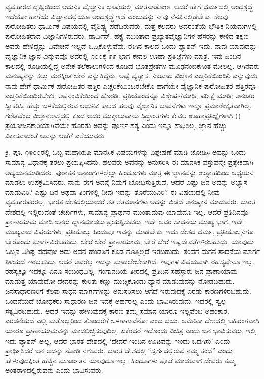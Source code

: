 ವ್ಯವಹಾರದ ದೃಷ್ಟಿಯಿಂದ ಆಧುನಿಕ ವೈಜ್ಞಾನಿಕ ಭಾಷೆಯಲ್ಲಿ ಮಾತನಾಡೋಣ. ಆದರೆ ಹೇಗೆ ಧರ್ಮದಲ್ಲಿ ಅಂಧಶ್ರದ್ಧೆ ಇದೆಯೋ ಹಾಗೆಯೆ ವಿಜ್ಞಾನದಲ್ಲಿಯೂ ಅಂಧಶ್ರದ್ಧೆ ಇದೆ ಎಂಬುದನ್ನು ನೀವು ನೆನಪಿನಲ್ಲಿಡಬೇಕು. ಕೆಲವು ಪುರೋಹಿತರು ಧಾರ್ಮಿಕ ವಿಷಯದಲ್ಲಿ ವೈಶಿಷ್ಟ್ಯ ಪಡೆದಿರುವರು. ಮತ್ತೆ ಕೆಲವರು ಅದರಂತೆಯೆ ಭೌತಿಕ ನಿಯಮಗಳಲ್ಲಿ ಪುರೋಹಿತರಾದ ವಿಜ್ಞಾನಿಗಳಿರುವರು. ಡಾರ್ವಿನ್, ಹಕ್ಸ್ಲೆ ಮುಂತಾದ ಪ್ರಖ್ಯಾತ\break ವೈಜ್ಞಾನಿಗಳ ಹೆಸರನ್ನು ಕೇಳಿದ ತಕ್ಷಣ ಅವರು ಹೇಳಿದ್ದನ್ನು ವಿವೇಚನೆ ಇಲ್ಲದೆ ಒಪ್ಪಿಕೊಳ್ಳುವೆವು. ಈಗಿನ ಕಾಲದ ಒಂದು ಫ್ಯಾಶನ್ ಇದು. ನಾವು ಯಾವುದನ್ನು ವೈಜ್ಞಾನಿಕ ಜ್ಞಾನ ಎನ್ನುವವೊ ಅದರಲ್ಲಿ ೧೦೦ಕ್ಕೆ ೯೯ ಭಾಗ ಕೇವಲ ಊಹಾ ಪ್ರತಿಜ್ಞೆಗಳು ಮಾತ್ರ. ಇವು ಹಿಂದಿನ ಕಾಲದಲ್ಲಿ ರೂಢಿಯಲ್ಲಿದ್ದ ಅನೇಕ ತಲೆಕಾಲುಗಳಿಂದ ಕೂಡಿದ ಭೂತಪ್ರೇತಗಳ ಮೂಢನಂಬಿಕೆಗಿಂತ ಮೇಲಲ್ಲ. ಆಗಿನವರು ಮನುಷ್ಯನನ್ನು ಕಲ್ಲು ಮರಕ್ಕಿಂತ ಬೇರೆ ಎನ್ನುತ್ತಿದ್ದರು. ಅಷ್ಟೆ ವ್ಯತ್ಯಾಸ. ನಿಜವಾದ ವಿಜ್ಞಾನ ಎಚ್ಚರಿಕೆಯಿಂದಿರಿ ಎನ್ನುವುದು. ನಾವು ಹೇಗೆ ಧಾರ್ಮಿಕ ಪುರೋಹಿತರ ಹತ್ತಿರ ಎಚ್ಚರಿಕೆಯಿಂದಿರಬೇಕೊ ಹಾಗೆಯೇ ವೈಜ್ಞಾನಿಕ ಪುರೋಹಿತರ ಹತ್ತಿರವೂ ಎಚ್ಚರಿಕೆಯಿಂದಿರಬೇಕು. ಅಪನಂಬಿಕೆಯಿಂದ ಹೊರಡಿ. ಪ್ರತಿಯೊಂದನ್ನೂ ವಿಶ್ಲೇಷಣೆಮಾಡಿ, ಪರೀಕ್ಷೆ ಮಾಡಿ; ಅನಂತರ ಸ್ವೀಕರಿಸಿ, ಹೆಚ್ಚು ಬಳಕೆಯಲ್ಲಿರುವ ಆಧುನಿಕ ಕಾಲದ ಹಲವು ವೈಜ್ಞಾನಿಕ ಭಾವನೆಗಳು ಇನ್ನೂ ಪ್ರಮಾಣೀಕೃತವಾಗಿಲ್ಲ. ಗಣಿತವೆಂಬ ವಿಜ್ಞಾನಶಾಸ್ತ್ರದಲ್ಲಿ ಕೂಡ ಅದರ ಮುಕ್ಕಾಲುಪಾಲು ಸಿದ್ದಾಂತಗಳು ಕೇವಲ ಊಹಾಪ್ರತಿಜ್ಞೆಗಳಾಗಿ () ಪ್ರಯೋಜನಕಾರಿಯಾಗಿವೆಯೇ ಹೊರತು ಅವನ್ನು ಪೂರ್ಣ ಸತ್ಯ ಎಂದು ಇನ್ನೂ ಸಾಧಿಸಿಲ್ಲ. ಜ್ಞಾನ ಹೆಚ್ಚು ವಿಕಾಸವಾದಂತೆ ಅವನ್ನು ಆಚೆಗೆ ಎಸೆಯುವರು.

ಕ್ರಿ. ಪೂ. ೧೪೦೦ರಲ್ಲಿ ಒಬ್ಬ ಮಹಾಋಷಿ ಮಾನಸಿಕ ವಿಷಯಗಳನ್ನು ವಿಶ್ಲೇಷಣೆ ಮಾಡಿ ಜೋಡಿಸಿ ಅವನ್ನು ಒಂದು ಸಾಮಾನ್ಯ ವಿಧಾನಕ್ಕೆ ತರಲು ಪ್ರಯತ್ನಿಸಿದನು. ಹಲವರು ಅವನನ್ನು ಅನುಸರಿಸಿ ಈ ಮಾನಸಿಕ ವಸ್ತುವನ್ನೇ ಪ್ರತ್ಯೇಕವಾಗಿ ಅಧ್ಯಯನಮಾಡಿದರು. ಪುರಾತನ ಜನಾಂಗಗಳಲ್ಲೆಲ್ಲಾ ಹಿಂದೂಗಳು ಮಾತ್ರ ಈ ಜ್ಞಾನವನ್ನು ಉತ್ಸಾಹದಿಂದ ಅಧ್ಯಯನ ಮಾಡಲು ಉಪಕ್ರಮಿಸಿದರು. ನಾನು ಈಗ ಅದನ್ನೆ ನಿಮಗೆ ಬೋಧಿಸುತ್ತಿರುವೆ. ಆದರೆ ಎಷ್ಟು ಜನ ಅದನ್ನು ಅಭ್ಯಾಸ ಮಾಡುವಿರಿ? ಎಷ್ಟು ದಿನ ಅಥವಾ ತಿಂಗಳಲ್ಲಿ ನೀವು ಇದನ್ನು ತೊರೆಯುವಿರಿ? ಈ ವಿಷಯದಲ್ಲಿ ನೀವು ವ್ಯವಹಾರಪರರಲ್ಲ. ಭಾರತ ದೇಶದಲ್ಲಿಯಾದರೆ ಶತ ಶತಮಾನಗಳು ಅದನ್ನು ಬಿಡದೆ ಅನುಷ್ಠಾನ ಮಾಡುವರು. ಭಾರತ ದೇಶದಲ್ಲಿ ಇಲ್ಲಿರುವಂತೆ ಚರ್ಚುಗಳು, ಸಾಮಾನ್ಯ ಪ್ರಾರ್ಥನೆ ಮುಂತಾದುವು ಯಾವುದೂ ಇಲ್ಲ. ಆದರೆ ಪ್ರತಿದಿನವೂ ಪ್ರಾಣಾಯಾಮ ಮಾಡಿ ಜನರು ಧ್ಯಾನಮಾಡಲು ಪ್ರಯತ್ನಿಸುವರು. ಇದೇ ಅವರ ಸಾಧನೆಯ ಮುಖ್ಯ ಭಾಗ. ಇವೇ ಮುಖ್ಯವಾದ ವಿಷಯಗಳು. ಪ್ರತಿಯೊಬ್ಬ ಹಿಂದುವೂ ಇವನ್ನು ಮಾಡಬೇಕು. ಇದು ದೇಶದ ಧರ್ಮ, ಪ್ರತಿಯೊಬ್ಬನಿಗೂ ಬೇರೊಂದು ಮಾರ್ಗವಿರಬಹುದು. ಬೇರೆ ಬೇರೆ ಪ್ರಾಣಾಯಾಮ, ಬೇರೆ ಬೇರೆ ಇಷ್ಟದೇವತೆಗಳಿರಬಹುದು. ಯಾವುದು ಒಬ್ಬನ ವಿಶಿಷ್ಟ ಪಥವೋ ಅದು ಅವನ ಹೆಂಡತಿಗೆ ಕೂಡ ಗೊತ್ತಿಲ್ಲದೆ ಇರಬಹುದು. ತಂದೆಗೆ ಮಗನ ಸಾಧನೆಯ ಮಾರ್ಗ ತಿಳಿಯದೆ ಇರಬಹುದು. ಆದರೆ ಅವರೆಲ್ಲ ಇದನ್ನು ಮಾಡಲೇಬೇಕಾಗಿದೆ. ಇವುಗಳ ವಿಷಯವಾಗಿ ರಹಸ್ಯವೇನೂ ಇಲ್ಲ. ರಹಸ್ಯಕ್ಕೂ ಇದಕ್ಕೂ ಏನೂ ಸಂಬಂಧವಿಲ್ಲ. ಗಂಗಾನದಿಯ ತೀರದಲ್ಲಿ ಪ್ರತಿದಿನ ಸಹಸ್ರಾರು ಜನ ಪ್ರಾಣಾಯಾಮ ಮಾಡುತ್ತ ಯಾವುದೋ ದೇವರನ್ನು ಕುರಿತು ಕಣ್ಣು ಮುಚ್ಚಿಕೊಂಡು ಧ್ಯಾನ ಮಾಡುವುದನ್ನು ನೋಡಬಹುದು. ಜನಸಾಧಾರಣರಿಗೆ ಕೆಲವು ಸಾಧನ ಮಾರ್ಗಗಳನ್ನು ಅನುಸರಿಸಲು ಆಗದೆ ಇರುವುದಕ್ಕೆ ಎರಡು ಕಾರಣಗಳಿರಬಹುದು. ಒಂದನೆಯದೆ ಬೋಧಕರು ಸಾಧಾರಣ ಜನ ಇದಕ್ಕೆ ಅರ್ಹರಲ್ಲ ಎಂದು ಭಾವಿಸಿರುವುದು. ಇದರಲ್ಲಿ ಸ್ವಲ್ಪ ಸತ್ಯವಿರಬಹುದು. ಆದರೆ ಇದನ್ನು ಹೇಳುವುದಕ್ಕೆ ಕಾರಣ ತಮ್ಮ ಸಮಾನ ಯಾರೂ ಇಲ್ಲವೆಂಬ ಅಹಂಕಾರ. ಎರಡನೆಯದೆ ಎಲ್ಲಿ ಮತ್ತೊಬ್ಬರಿಂದ ತೊಂದರೆಗೆ ಒಳಗಾಗುವೆನೋ ಎಂಬ ಭಯ. ಅಮೆರಿಕಾ ದೇಶದಲ್ಲಿ ಬಹಿರಂಗವಾಗಿ ಯಾರೂ ಪ್ರಾಣಾಯಾಮವನ್ನು ಮಾಡಲಿಚ್ಚಿಸುವುದಿಲ್ಲ. ಏಕೆಂದರೆ ಇದೊಂದು ವಿಚಿತ್ರ ಎಂದು ಜನ ಭಾವಿಸುವರು. ಇಲ್ಲಿ ಇದು ಫ್ಯಾಶನ್ ಅಲ್ಲ. ಆದರೆ ಭಾರತ ದೇಶದಲ್ಲಿ `ದೇವರೆ ಇಂದಿನ ಊಟವನ್ನು ಇಂದು ಒದಗಿಸು' ಎಂದು ಪ್ರಾರ್ಥಿಸಿದರೆ ಜನ ಅದನ್ನು ನೋಡಿ ನಗುವರು. ಭಾರತ ದೇಶದಲ್ಲಿ “ಸ್ವರ್ಗದಲ್ಲಿರುವ ನಮ್ಮ ತಂದೆ'' ಎಂದು ಹೇಳುವುದಕ್ಕಿಂತ ಹೆಚ್ಚಿನ ಮೂರ್ಖತನ ಯಾವುದೂ ಇಲ್ಲ. ಹಿಂದೂಗಳು ಪೂಜೆ ಮಾಡುವಾಗ ದೇವರು ತಮ್ಮ ಅಂತರಾಳದಲ್ಲಿರುವನು ಎಂದು ಭಾವಿಸುವರು.

